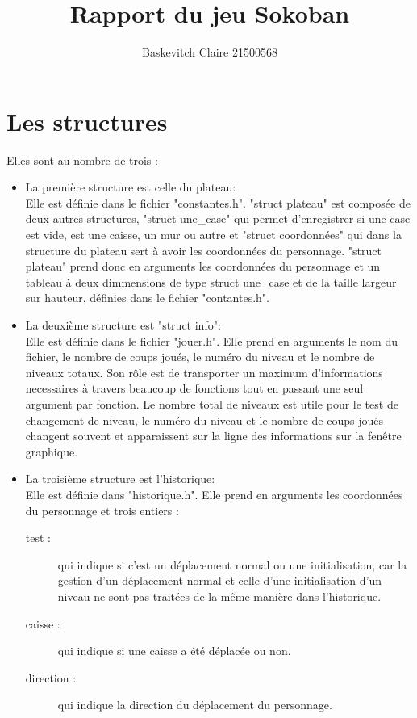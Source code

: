 \documentclass{report}
\title{\textbf{\huge Rapport du jeu Sokoban}}
\author{Baskevitch Claire 21500568}
\begin{document}
\maketitle


	\chapter{Les structures}
Elles sont au nombre de trois :
\begin{itemize}
\item La première structure est celle du plateau:\\
Elle est définie dans le fichier "constantes.h".
"struct plateau" est composée de deux autres structures, "struct une\_case" qui permet d'enregistrer si une case est vide, est une caisse, un mur ou autre et "struct coordonnées" qui dans la structure du plateau sert à avoir les coordonnées du personnage.
"struct plateau" prend donc en arguments les coordonnées du personnage et un tableau à deux dimmensions de type struct une\_case et de la taille largeur sur hauteur, définies dans le fichier "contantes.h".

\item La deuxième structure est "struct info":\\
Elle est définie dans le fichier "jouer.h".
Elle prend en arguments le nom du fichier, le nombre de coups joués, le numéro du niveau et le nombre de niveaux totaux.
Son rôle est de transporter un maximum d'informations necessaires à travers beaucoup de fonctions tout en passant une seul argument par fonction.
Le nombre total de niveaux est utile pour le test de changement de niveau, le numéro du niveau et le nombre de coups joués changent souvent et apparaissent sur la ligne des informations sur la fenêtre graphique.

\item La troisième structure est l'historique:\\
Elle est définie dans "historique.h".
Elle prend en arguments les coordonnées du personnage et trois entiers :
\begin{description}
\item[test :]qui indique si c'est un déplacement normal ou une initialisation, car la gestion d'un déplacement normal et celle d'une initialisation d'un niveau ne sont pas traitées de la même manière dans l'historique.
\item[caisse :]qui indique si une caisse a été déplacée ou non.
\item[direction :]qui indique la direction du déplacement du personnage.
\end{description}
\end{itemize}
\end{document}
